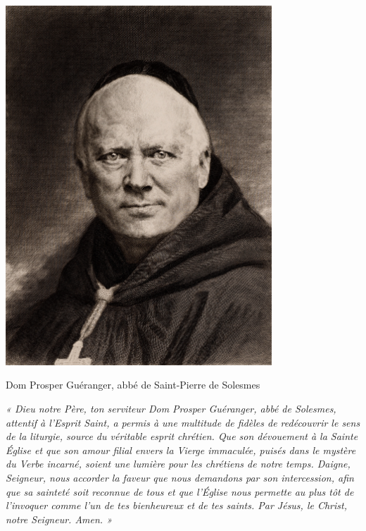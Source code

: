 \documentclass[10pt, twoside, french]{book}
\begin{document}
\newpage

\thispagestyle{empty}
\printindex[K]
\printindex[I]
\printindex[G]
\printindex[AL]
\printindex[S]
\printindex[O]
\printindex[C]
\printindex[H]
\printindex[A]
\printindex[R]
\printindex[P]

\newpage
\thispagestyle{empty}
\begin{center}
\includegraphics[width=10cm]{dom_gueranger.jpg}
\vspace{2mm}\par
Dom Prosper Guéranger, abbé de Saint-Pierre de Solesmes\par
\end{center}

\vfill

\emph{« Dieu notre Père, ton serviteur Dom Prosper Guéranger, abbé de Solesmes, attentif à l’Esprit Saint, a permis à une multitude de fidèles de redécouvrir le sens de la liturgie, source du véritable esprit chrétien. Que son dévouement à la Sainte Église et que son amour filial envers la Vierge immaculée, puisés dans le mystère du Verbe incarné, soient une lumière pour les chrétiens de notre temps. Daigne, Seigneur, nous accorder la faveur que nous demandons par son intercession, afin que sa sainteté soit reconnue de tous et que l’Église nous permette au plus tôt de l’invoquer comme l’un de tes bienheureux et de tes saints. Par Jésus, le Christ, notre Seigneur. Amen. »}

\newpage

\null

\newpage

\tableofcontents
\thispagestyle{empty}
\end{document}
